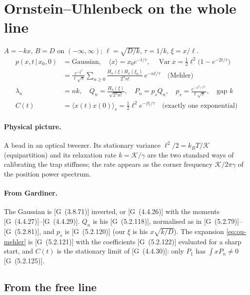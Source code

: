 \documentclass[11pt]{article}
\numberwithin{equation}{section}
\newcommand{\avg}[1]{\langle #1\rangle}
\newcommand{\given}{\,|\,}
\newcommand{\G}[1]{[G~(#1)]}
\begin{document}
\section{Ornstein--Uhlenbeck on the whole line}
\label{sec:ou-line}

\begin{keyresults}
$A=-kx$, $B=D$ on $(-\infty,\infty)$; $\ell=\sqrt{D/k}$, $\tau=1/k$, $\xi=x/\ell$.
\begin{align}
  p(x,t\given x_0,0) &= \text{Gaussian},\quad \avg x=x_0e^{-t/\tau},\quad
  \operatorname{Var}x=\tfrac12\ell^2\bigl(1-e^{-2t/\tau}\bigr) \\
  &= \frac{e^{-\xi^2}}{\ell\sqrt\pi}\sum_{n\ge0}\frac{H_n(\xi)H_n(\xi_0)}{2^nn!}\,e^{-nt/\tau}
  \quad\text{(Mehler)} \label{eq:ou-mehler}\\
  \lambda_n &= nk,\quad Q_n=\frac{H_n(\xi)}{\sqrt{2^nn!}},\quad P_n=p_sQ_n,\quad p_s=\frac{e^{-x^2/\ell^2}}{\ell\sqrt\pi},
  \quad\text{gap }k \\
  C(t) &= \avg{x(t)x(0)}_s=\tfrac12\ell^2e^{-|t|/\tau}\quad\text{(exactly one exponential)}
\end{align}
\end{keyresults}

\paragraph{Physical picture.} A bead in an optical tweezer. Its stationary variance $\ell^2/2=k_BT/\mathcal K$
(equipartition) and its relaxation rate $k=\mathcal K/\gamma$ are the two standard ways of calibrating the trap
stiffness; the rate appears as the corner frequency $\mathcal K/2\pi\gamma$ of the position power spectrum.

\paragraph{From Gardiner.} The Gaussian is \G{3.8.71} inverted, or \G{4.4.26} with the moments
\G{4.4.27}--\G{4.4.29}. $Q_n$ is his \G{5.2.118}, normalised as in \G{5.2.79}--\G{5.2.81}, and $p_s$ is \G{5.2.120}
(our $\xi$ is his $x\sqrt{k/D}$). The expansion \cref{eq:ou-mehler} is \G{5.2.121} with the coefficients \G{5.2.122}
evaluated for a sharp start, and $C(t)$ is the stationary limit of \G{4.4.30}: only $P_1$ has $\int xP_n\ne0$
\G{5.2.125}.

\subsection{From the free line}
\end{document}
